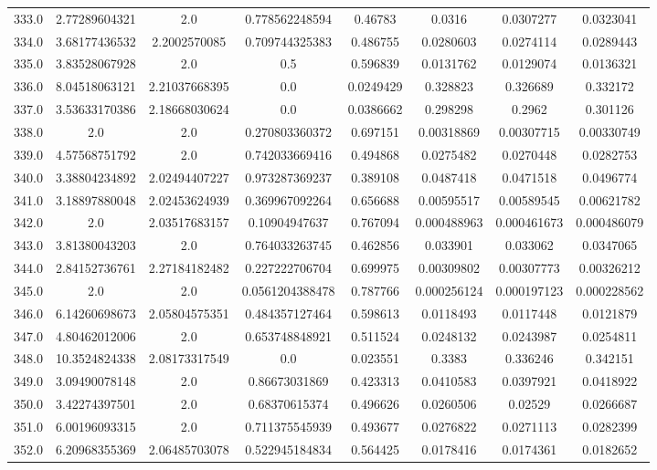 \begin{longtable}{|c|c|c|c|c|c|c|c|}
333.0 & 2.77289604321 & 2.0 & 0.778562248594 & 0.46783 & 0.0316 & 0.0307277 & 0.0323041 \\
334.0 & 3.68177436532 & 2.2002570085 & 0.709744325383 & 0.486755 & 0.0280603 & 0.0274114 & 0.0289443 \\
335.0 & 3.83528067928 & 2.0 & 0.5 & 0.596839 & 0.0131762 & 0.0129074 & 0.0136321 \\
336.0 & 8.04518063121 & 2.21037668395 & 0.0 & 0.0249429 & 0.328823 & 0.326689 & 0.332172 \\
337.0 & 3.53633170386 & 2.18668030624 & 0.0 & 0.0386662 & 0.298298 & 0.2962 & 0.301126 \\
338.0 & 2.0 & 2.0 & 0.270803360372 & 0.697151 & 0.00318869 & 0.00307715 & 0.00330749 \\
339.0 & 4.57568751792 & 2.0 & 0.742033669416 & 0.494868 & 0.0275482 & 0.0270448 & 0.0282753 \\
340.0 & 3.38804234892 & 2.02494407227 & 0.973287369237 & 0.389108 & 0.0487418 & 0.0471518 & 0.0496774 \\
341.0 & 3.18897880048 & 2.02453624939 & 0.369967092264 & 0.656688 & 0.00595517 & 0.00589545 & 0.00621782 \\
342.0 & 2.0 & 2.03517683157 & 0.10904947637 & 0.767094 & 0.000488963 & 0.000461673 & 0.000486079 \\
343.0 & 3.81380043203 & 2.0 & 0.764033263745 & 0.462856 & 0.033901 & 0.033062 & 0.0347065 \\
344.0 & 2.84152736761 & 2.27184182482 & 0.227222706704 & 0.699975 & 0.00309802 & 0.00307773 & 0.00326212 \\
345.0 & 2.0 & 2.0 & 0.0561204388478 & 0.787766 & 0.000256124 & 0.000197123 & 0.000228562 \\
346.0 & 6.14260698673 & 2.05804575351 & 0.484357127464 & 0.598613 & 0.0118493 & 0.0117448 & 0.0121879 \\
347.0 & 4.80462012006 & 2.0 & 0.653748848921 & 0.511524 & 0.0248132 & 0.0243987 & 0.0254811 \\
348.0 & 10.3524824338 & 2.08173317549 & 0.0 & 0.023551 & 0.3383 & 0.336246 & 0.342151 \\
349.0 & 3.09490078148 & 2.0 & 0.86673031869 & 0.423313 & 0.0410583 & 0.0397921 & 0.0418922 \\
350.0 & 3.42274397501 & 2.0 & 0.68370615374 & 0.496626 & 0.0260506 & 0.02529 & 0.0266687 \\
351.0 & 6.00196093315 & 2.0 & 0.711375545939 & 0.493677 & 0.0276822 & 0.0271113 & 0.0282399 \\
352.0 & 6.20968355369 & 2.06485703078 & 0.522945184834 & 0.564425 & 0.0178416 & 0.0174361 & 0.0182652 \\

\end{longtable}
